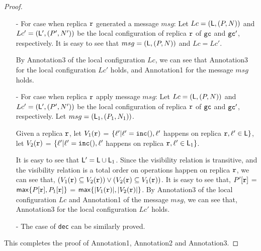 \begin {proof}
\begin{itemize}
    It is easy to see that $P'=P[r:P[r]+1]$, $N'=N$, and $\alabelset' = \alabelset \cup \{ \alabel \}$. By Annotation3 of the local configuration $Lc$, we can see that Annotation3 for the local configuration $Lc'$ holds, and Annotation2 for the ``virtual message'' $(\alabel,(P',N'))$ holds.

\item[-] For case when replica $\arep$ generated a message $msg$: Let $Lc = (\alabelset,(P,N))$ and $Lc' = (\alabelset',(P',N'))$ be the local configuration of replica $\arep$ of $\aglobalstate$ and $\aglobalstate'$, respectively. It is easy to see that $msg = (\alabelset,(P,N))$ and $Lc = Lc'$.

    By Annotation3 of the local configuration $Lc$, we can see that Annotation3 for the local configuration $Lc'$ holds, and Annotation1 for the message $msg$ holds.

\item[-] For case when replica $\arep$ apply message $msg$: Let $Lc = (\alabelset,(P,N))$ and $Lc' = (\alabelset',(P',N'))$ be the local configuration of replica $\arep$ of $\aglobalstate$ and $\aglobalstate'$, respectively. Let $msg = (\alabelset_1,(P_1,N_1))$.

    Given a replica $\arep$, let $V_1(\arep)$ =  $\{ \alabel' \vert \alabel' = \alabelshort[{\tt inc}]{}, \alabel'$ happens on replica $\arep, \alabel' \in \alabelset \}$, let $V_2(\arep)$ =  $\{ \alabel' \vert \alabel' = \alabelshort[{\tt inc}]{}, \alabel'$ happens on replica $\arep, \alabel' \in \alabelset_1 \}$.

    It is easy to see that $\alabelset' = \alabelset \cup \alabelset_1$. Since the visibility relation is transitive, and the visibility relation is a total order on operations happen on replica $\arep$, we can see that, $( V_1(\arep) \subseteq V_2(\arep) ) \vee ( V_2(\arep) \subseteq V_1(\arep) )$. It is easy to see that, $P'[\arep]$ = $\mathsf{max}\{ P[\arep], P_1[\arep] \}$ = $\mathsf{max}\{ \vert V_1(\arep) \vert ,\vert V_2(\arep) \vert \}$. By Annotation3 of the local configuration $Lc$ and Annotation1 of the message $msg$, we can see that, Annotation3 for the local configuration $Lc'$ holds.

\item[-] The case of {\tt dec} can be similarly proved.
\end{itemize}

This completes the proof of Annotation1, Annotation2 and Annotation3. 




\end{proof}
